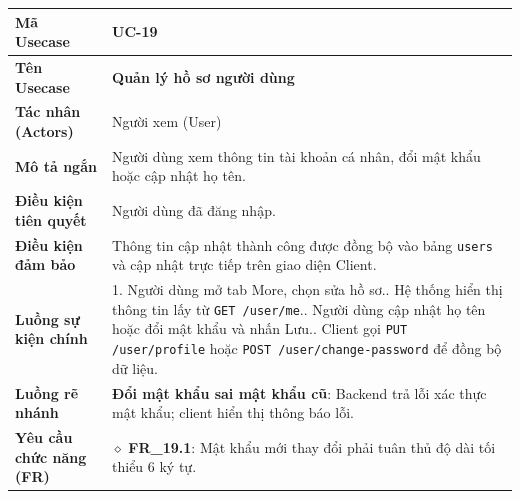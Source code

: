 \begin{table}[H]
\renewcommand{\arraystretch}{1.3}
\centering
\begin{tabularx}{\textwidth}{|p{4.5cm}|X|}
\hline
\cellcolor{gray!15}\bfseries Mã Usecase & \textbf{UC-19} \\ \hline
\cellcolor{gray!15}\bfseries Tên Usecase & \textbf{Quản lý hồ sơ người dùng} \\ \hline
\cellcolor{gray!15}\bfseries Tác nhân (Actors) & Người xem (User) \\ \hline
\cellcolor{gray!15}\bfseries Mô tả ngắn & Người dùng xem thông tin tài khoản cá nhân, đổi mật khẩu hoặc cập nhật họ tên. \\ \hline
\cellcolor{gray!15}\bfseries Điều kiện tiên quyết & Người dùng đã đăng nhập. \\ \hline
\cellcolor{gray!15}\bfseries Điều kiện đảm bảo & Thông tin cập nhật thành công được đồng bộ vào bảng \texttt{users} và cập nhật trực tiếp trên giao diện Client. \\ \hline
\cellcolor{gray!15}\bfseries Luồng sự kiện chính & 1. Người dùng mở tab More, chọn sửa hồ sơ.\newline 2. Hệ thống hiển thị thông tin lấy từ \texttt{GET /user/me}.\newline 3. Người dùng cập nhật họ tên hoặc đổi mật khẩu và nhấn Lưu.\newline 4. Client gọi \texttt{PUT /user/profile} hoặc \texttt{POST /user/change-password} để đồng bộ dữ liệu. \\ \hline
\cellcolor{gray!15}\bfseries Luồng rẽ nhánh & \textbf{Đổi mật khẩu sai mật khẩu cũ}: Backend trả lỗi xác thực mật khẩu; client hiển thị thông báo lỗi. \\ \hline
\cellcolor{gray!15}\bfseries Yêu cầu chức năng (FR) & $\diamond$ \textbf{FR\_19.1}: Mật khẩu mới thay đổi phải tuân thủ độ dài tối thiểu 6 ký tự. \\ \hline
\end{tabularx}
\end{table}
